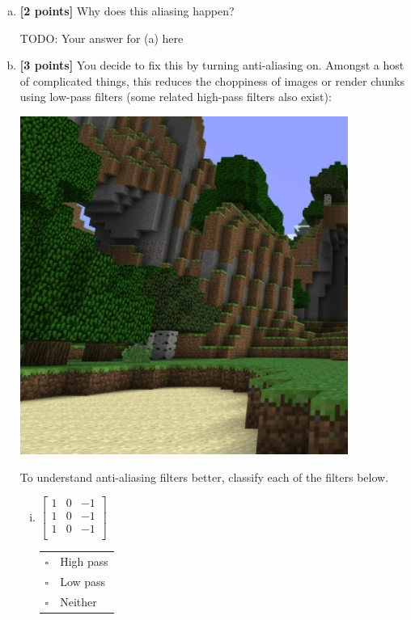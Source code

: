 \begin{enumerate}[(a)]
\item \textbf{[2 points]} Why does this aliasing happen? 

\begin{mdframed}
    TODO: Your answer for (a) here
\end{mdframed}

\item \textbf{[3 points]}
You decide to fix this by turning anti-aliasing on. Amongst a host of complicated things, this reduces the choppiness of images or render chunks using low-pass filters (some related high-pass filters also exist):

\includegraphics[width=\textwidth * 5/10]{images/anti-aliased-minecraft.png}

To understand anti-aliasing filters better, classify each of the filters below.

\begin{enumerate}[(i)]
\item
 $\begin{bmatrix}
    1 & 0 & -1 \\
    1 & 0 & -1 \\
    1 & 0 & -1 \\
 \end{bmatrix}$
\begin{tabular}[h]{ll}
$\square$ & High pass \\
$\square$ & Low pass \\
$\square$ & Neither \\
\end{tabular}


\end{enumerate}
\end{enumerate}
